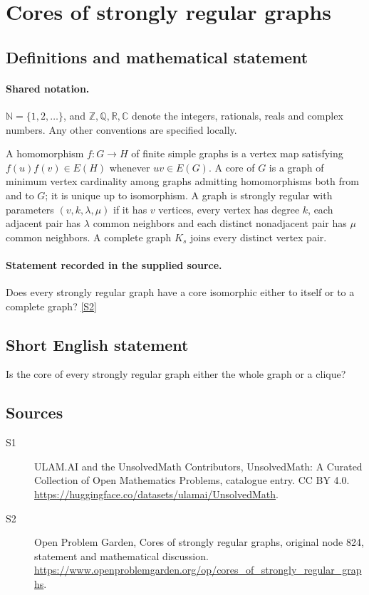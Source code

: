 \documentclass[11pt]{article}
\newcommand{\sref}[2]{\hyperlink{source:#1:#2}{[S#2]}}
\begin{document}
\section{Cores of strongly regular graphs}\label{statement}

\subsection{Definitions and mathematical statement}

\paragraph{Shared notation.}$\mathbb N=\{1,2,\ldots\}$, and $\mathbb Z,\mathbb Q,\mathbb R,\mathbb C$ denote the integers, rationals, reals and complex numbers. Any other conventions are specified locally.


A homomorphism $f:G\to H$ of finite simple graphs is a vertex map satisfying $f(u)f(v)\in E(H)$ whenever $uv\in E(G)$. A core of $G$ is a graph of minimum vertex cardinality among graphs admitting homomorphisms both from and to $G$; it is unique up to isomorphism. A graph is strongly regular with parameters $(v,k,\lambda,\mu)$ if it has $v$ vertices, every vertex has degree $k$, each adjacent pair has $\lambda$ common neighbors and each distinct nonadjacent pair has $\mu$ common neighbors. A complete graph $K_s$ joins every distinct vertex pair.
\paragraph{Statement recorded in the supplied source.}
Does every strongly regular graph have a core isomorphic either to itself or to a complete graph? \sref{statement}{2}
\subsection{Short English statement}
Is the core of every strongly regular graph either the whole graph or a clique?
\subsection{Sources}
\begin{description}
\item[\hypertarget{source:statement:1}{S1}] ULAM.AI and the UnsolvedMath Contributors, UnsolvedMath: A Curated Collection of Open Mathematics Problems, catalogue entry. CC BY 4.0. \url{https://huggingface.co/datasets/ulamai/UnsolvedMath}.
\item[\hypertarget{source:statement:2}{S2}] Open Problem Garden, Cores of strongly regular graphs, original node 824, statement and mathematical discussion. \url{https://www.openproblemgarden.org/op/cores_of_strongly_regular_graphs}.
\end{description}
\label{end:statement}
\end{document}

